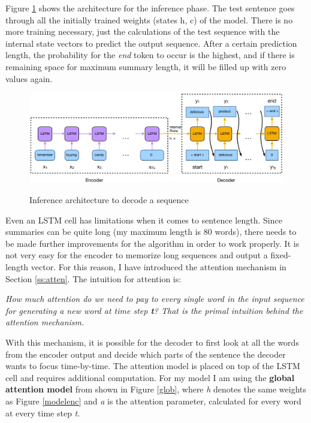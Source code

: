 Figure \ref{infer} shows the architecture for the inference phase. The test sentence goes through all the initially trained weights (states h, c) of the model. There is no more training necessary, just the calculations of the test sequence with the internal state vectors to predict the output sequence. After a certain prediction length, the probability for the \textit{end} token to occur is the highest, and if there is remaining space for maximum summary length, it will be filled up with zero values again. 

\begin{figure}
	\begin{center}
		\includegraphics[width=5in]{photos/infer-1}\\
		\caption{Inference architecture to decode a sequence}\label{infer}
	\end{center}
\end{figure}

Even an LSTM cell has limitations when it comes to sentence length. Since summaries can be quite long (my maximum length is 80 words), there needs to be made further improvements for the algorithm in order to work properly. It is not very easy for the encoder to memorize long sequences and output a fixed-length vector. For this reason, I have introduced the attention mechanism in Section \ref{ss:atten}. The intuition for attention is:

\begin{tcolorbox}
	\textit{How much attention do we need to pay to every single word in the input sequence for generating a new word at time step \textbf{t}? That is the primal intuition behind the attention mechanism.}
\end{tcolorbox}

With this mechanism, it is possible for the decoder to first look at all the words from the encoder output and decide which parts of the sentence the decoder wants to focus time-by-time. The attention model is placed on top of the LSTM cell and requires additional computation. For my model I am using the \textbf{global attention model} from \cite{effectiveattn} shown in Figure \ref{glob}, where \textit{h} denotes the same weights as Figure \ref{modelenc} and \textit{a} is the attention parameter, calculated for every word at every time step \textit{t}.

